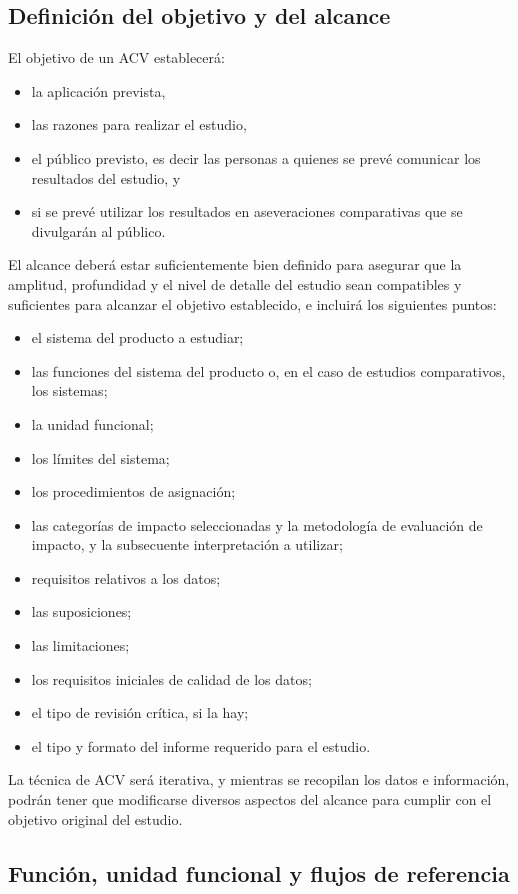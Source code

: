 \subsection{Definición del objetivo y del alcance}
El objetivo de un ACV establecerá:
\begin{itemize}
  \item la aplicación prevista,
  \item las razones para realizar el estudio,
  \item el público previsto, es decir las personas a quienes se prevé comunicar los resultados del estudio, y
  \item si se prevé utilizar los resultados en aseveraciones comparativas que se divulgarán al público.
\end{itemize}

El alcance deberá estar suficientemente bien definido para asegurar que la amplitud, profundidad y el nivel de detalle del estudio sean compatibles y suficientes para alcanzar el objetivo establecido, e incluirá los siguientes puntos:
\begin{itemize}
  \item el sistema del producto a estudiar;
  \item las funciones del sistema del producto o, en el caso de estudios comparativos, los sistemas;
  \item la unidad funcional;
  \item los límites del sistema;
  \item los procedimientos de asignación;
  \item las categorías de impacto seleccionadas y la metodología de evaluación de impacto, y la subsecuente interpretación a utilizar;
  \item requisitos relativos a los datos;
  \item las suposiciones;
  \item las limitaciones;
  \item los requisitos iniciales de calidad de los datos;
  \item el tipo de revisión crítica, si la hay;
  \item el tipo y formato del informe requerido para el estudio.
\end{itemize}

La técnica de ACV será iterativa, y mientras se recopilan los datos e información, podrán tener que modificarse diversos
aspectos del alcance para cumplir con el objetivo original del estudio.

\subsection{Función, unidad funcional y flujos de referencia}

